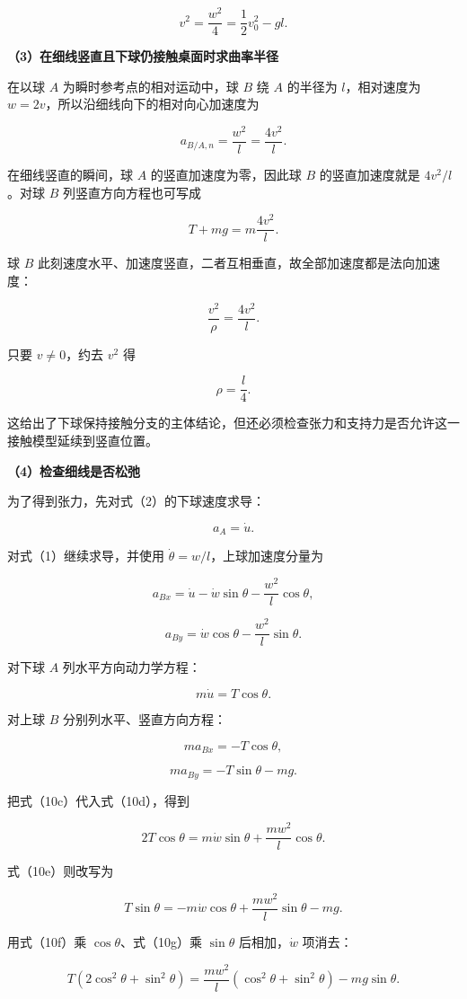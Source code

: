 \documentclass[12pt,a4paper,UTF8]{ctexart}
\begin{document}
\[
v^2=\frac{w^2}{4}=\frac12v_0^2-gl.
\tag{7}
\]

\textbf{（3）在细线竖直且下球仍接触桌面时求曲率半径}

在以球 \(A\) 为瞬时参考点的相对运动中，球 \(B\) 绕 \(A\) 的半径为
\(l\)，相对速度为 \(w=2v\)，所以沿细线向下的相对向心加速度为

\[
a_{B/A,n}=\frac{w^2}{l}=\frac{4v^2}{l}.
\]

在细线竖直的瞬间，球 \(A\) 的竖直加速度为零，因此球 \(B\)
的竖直加速度就是 \(4v^2/l\)。对球 \(B\) 列竖直方向方程也可写成

\[
T+mg=m\frac{4v^2}{l}.
\tag{8}
\]

球 \(B\)
此刻速度水平、加速度竖直，二者互相垂直，故全部加速度都是法向加速度：

\[
\frac{v^2}{\rho}=\frac{4v^2}{l}.
\]

只要 \(v\neq0\)，约去 \(v^2\) 得

\[
\boxed{\rho=\frac{l}{4}}.
\tag{9}
\]

这给出了下球保持接触分支的主体结论，但还必须检查张力和支持力是否允许这一接触模型延续到竖直位置。

\textbf{（4）检查细线是否松弛}

为了得到张力，先对式（2）的下球速度求导：

\[
a_A=\dot u.
\]

对式（1）继续求导，并使用 \(\dot\theta=w/l\)，上球加速度分量为

\[
a_{Bx}=\dot u-\dot w\sin\theta-\frac{w^2}{l}\cos\theta,
\tag{10a}
\]

\[
a_{By}=\dot w\cos\theta-\frac{w^2}{l}\sin\theta.
\tag{10b}
\]

对下球 \(A\) 列水平方向动力学方程：

\[
m\dot u=T\cos\theta.
\tag{10c}
\]

对上球 \(B\) 分别列水平、竖直方向方程：

\[
m a_{Bx}=-T\cos\theta,
\tag{10d}
\]

\[
m a_{By}=-T\sin\theta-mg.
\tag{10e}
\]

把式（10c）代入式（10d），得到

\[
2T\cos\theta
=m\dot w\sin\theta+\frac{mw^2}{l}\cos\theta.
\tag{10f}
\]

式（10e）则改写为

\[
T\sin\theta
=-m\dot w\cos\theta+\frac{mw^2}{l}\sin\theta-mg.
\tag{10g}
\]

用式（10f）乘 \(\cos\theta\)、式（10g）乘 \(\sin\theta\)
后相加，\(\dot w\) 项消去：

\[
T(2\cos^2\theta+\sin^2\theta)
=\frac{mw^2}{l}(\cos^2\theta+\sin^2\theta)-mg\sin\theta.
\]
\end{document}
